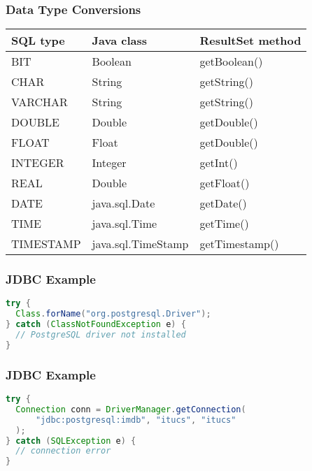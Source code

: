 \documentclass[dvipsnames]{beamer}
\theoremstyle{plain}
\begin{document}
\begin{frame}
  \frametitle{Data Type Conversions}

  \begin{table}
    \begin{tabular}{|l|l|l|}\hline
SQL type  & Java class         & ResultSet method\\\hline\hline
BIT       & Boolean            & getBoolean()    \\\hline
CHAR      & String             & getString()     \\\hline
VARCHAR   & String             & getString()     \\\hline
DOUBLE    & Double             & getDouble()     \\\hline
FLOAT     & Float              & getDouble()     \\\hline
INTEGER   & Integer            & getInt()        \\\hline
REAL      & Double             & getFloat()      \\\hline
DATE      & java.sql.Date      & getDate()       \\\hline
TIME      & java.sql.Time      & getTime()       \\\hline
TIMESTAMP & java.sql.TimeStamp & getTimestamp()  \\\hline
    \end{tabular}
  \end{table}
\end{frame}

\begin{frame}[fragile]
  \frametitle{JDBC Example}

  \begin{example}
    \begin{lstlisting}[language=Java]
try {
  Class.forName("org.postgresql.Driver");
} catch (ClassNotFoundException e) {
  // PostgreSQL driver not installed
}
    \end{lstlisting}
  \end{example}
\end{frame}

\begin{frame}[fragile]
  \frametitle{JDBC Example}

  \begin{example}[connecting]
    \begin{lstlisting}[language=Java]
try {
  Connection conn = DriverManager.getConnection(
      "jdbc:postgresql:imdb", "itucs", "itucs"
  );
} catch (SQLException e) {
  // connection error
}
    \end{lstlisting}
  \end{example}
\end{frame}
\end{document}
